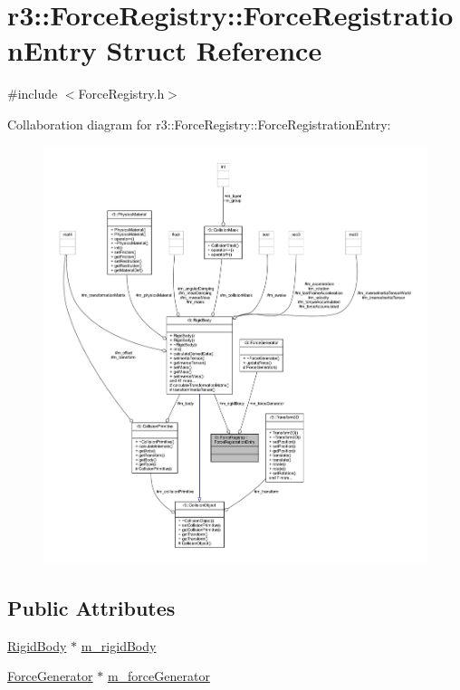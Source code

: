 \hypertarget{structr3_1_1_force_registry_1_1_force_registration_entry}{}\section{r3\+:\+:Force\+Registry\+:\+:Force\+Registration\+Entry Struct Reference}
\label{structr3_1_1_force_registry_1_1_force_registration_entry}


{\ttfamily \#include $<$Force\+Registry.\+h$>$}



Collaboration diagram for r3\+:\+:Force\+Registry\+:\+:Force\+Registration\+Entry\+:\nopagebreak
\begin{figure}[H]
\begin{center}
\leavevmode
\includegraphics[width=350pt]{structr3_1_1_force_registry_1_1_force_registration_entry__coll__graph}
\end{center}
\end{figure}
\subsection*{Public Attributes}
\begin{DoxyCompactItemize}
\item 
\mbox{\hyperlink{classr3_1_1_rigid_body}{Rigid\+Body}} $\ast$ \mbox{\hyperlink{structr3_1_1_force_registry_1_1_force_registration_entry_a103ff58c0c8f46f2ed1927976bc5dc87}{m\+\_\+rigid\+Body}}
\item 
\mbox{\hyperlink{classr3_1_1_force_generator}{Force\+Generator}} $\ast$ \mbox{\hyperlink{structr3_1_1_force_registry_1_1_force_registration_entry_aa2af182d8c92d8da8d6045ea4f4a5e16}{m\+\_\+force\+Generator}}
\end{DoxyCompactItemize}



